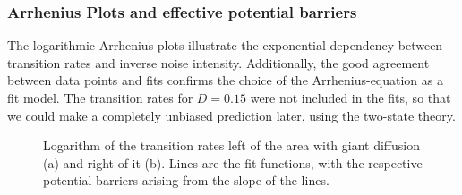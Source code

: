 \documentclass[12pt,a4paper]{article}
\begin{document}
\subsubsection{Arrhenius Plots and effective potential barriers}
The logarithmic Arrhenius plots illustrate the exponential dependency between transition rates and inverse noise intensity. Additionally, the good agreement between data points and fits confirms the choice of the Arrhenius-equation as a fit model. The transition rates for $D=0.15$ were not included in the fits, so that we could make a completely unbiased prediction later, using the two-state theory.
\begin{figure}[H]
	\hspace*{-0.5cm}
	\caption{Logarithm of the transition rates left of the area with giant diffusion (a) and right of it (b). Lines are the fit functions, with the respective potential barriers arising from the slope of the lines. }
	\label{arrhplotsanhopf}
\end{figure}
\end{document}
